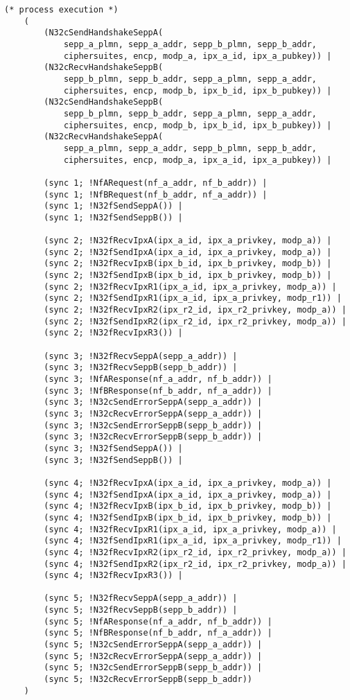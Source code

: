 \begin{lstlisting}[caption={Definition of the main process},label={lst:main-proc},firstnumber=1508]
    (* process execution *)
    (
        (N32cSendHandshakeSeppA(
            sepp_a_plmn, sepp_a_addr, sepp_b_plmn, sepp_b_addr,
            ciphersuites, encp, modp_a, ipx_a_id, ipx_a_pubkey)) |
        (N32cRecvHandshakeSeppB(
            sepp_b_plmn, sepp_b_addr, sepp_a_plmn, sepp_a_addr,
            ciphersuites, encp, modp_b, ipx_b_id, ipx_b_pubkey)) |
        (N32cSendHandshakeSeppB(
            sepp_b_plmn, sepp_b_addr, sepp_a_plmn, sepp_a_addr,
            ciphersuites, encp, modp_b, ipx_b_id, ipx_b_pubkey)) |
        (N32cRecvHandshakeSeppA(
            sepp_a_plmn, sepp_a_addr, sepp_b_plmn, sepp_b_addr,
            ciphersuites, encp, modp_a, ipx_a_id, ipx_a_pubkey)) |

        (sync 1; !NfARequest(nf_a_addr, nf_b_addr)) |
        (sync 1; !NfBRequest(nf_b_addr, nf_a_addr)) |
        (sync 1; !N32fSendSeppA()) |
        (sync 1; !N32fSendSeppB()) |

        (sync 2; !N32fRecvIpxA(ipx_a_id, ipx_a_privkey, modp_a)) |
        (sync 2; !N32fSendIpxA(ipx_a_id, ipx_a_privkey, modp_a)) |
        (sync 2; !N32fRecvIpxB(ipx_b_id, ipx_b_privkey, modp_b)) |
        (sync 2; !N32fSendIpxB(ipx_b_id, ipx_b_privkey, modp_b)) |
        (sync 2; !N32fRecvIpxR1(ipx_a_id, ipx_a_privkey, modp_a)) |
        (sync 2; !N32fSendIpxR1(ipx_a_id, ipx_a_privkey, modp_r1)) |
        (sync 2; !N32fRecvIpxR2(ipx_r2_id, ipx_r2_privkey, modp_a)) |
        (sync 2; !N32fSendIpxR2(ipx_r2_id, ipx_r2_privkey, modp_a)) |
        (sync 2; !N32fRecvIpxR3()) |

        (sync 3; !N32fRecvSeppA(sepp_a_addr)) |
        (sync 3; !N32fRecvSeppB(sepp_b_addr)) |
        (sync 3; !NfAResponse(nf_a_addr, nf_b_addr)) |
        (sync 3; !NfBResponse(nf_b_addr, nf_a_addr)) |
        (sync 3; !N32cSendErrorSeppA(sepp_a_addr)) |
        (sync 3; !N32cRecvErrorSeppA(sepp_a_addr)) |
        (sync 3; !N32cSendErrorSeppB(sepp_b_addr)) |
        (sync 3; !N32cRecvErrorSeppB(sepp_b_addr)) |
        (sync 3; !N32fSendSeppA()) |
        (sync 3; !N32fSendSeppB()) |

        (sync 4; !N32fRecvIpxA(ipx_a_id, ipx_a_privkey, modp_a)) |
        (sync 4; !N32fSendIpxA(ipx_a_id, ipx_a_privkey, modp_a)) |
        (sync 4; !N32fRecvIpxB(ipx_b_id, ipx_b_privkey, modp_b)) |
        (sync 4; !N32fSendIpxB(ipx_b_id, ipx_b_privkey, modp_b)) |
        (sync 4; !N32fRecvIpxR1(ipx_a_id, ipx_a_privkey, modp_a)) |
        (sync 4; !N32fSendIpxR1(ipx_a_id, ipx_a_privkey, modp_r1)) |
        (sync 4; !N32fRecvIpxR2(ipx_r2_id, ipx_r2_privkey, modp_a)) |
        (sync 4; !N32fSendIpxR2(ipx_r2_id, ipx_r2_privkey, modp_a)) |
        (sync 4; !N32fRecvIpxR3()) |

        (sync 5; !N32fRecvSeppA(sepp_a_addr)) |
        (sync 5; !N32fRecvSeppB(sepp_b_addr)) |
        (sync 5; !NfAResponse(nf_a_addr, nf_b_addr)) |
        (sync 5; !NfBResponse(nf_b_addr, nf_a_addr)) |
        (sync 5; !N32cSendErrorSeppA(sepp_a_addr)) |
        (sync 5; !N32cRecvErrorSeppA(sepp_a_addr)) |
        (sync 5; !N32cSendErrorSeppB(sepp_b_addr)) |
        (sync 5; !N32cRecvErrorSeppB(sepp_b_addr))
    )
\end{lstlisting}